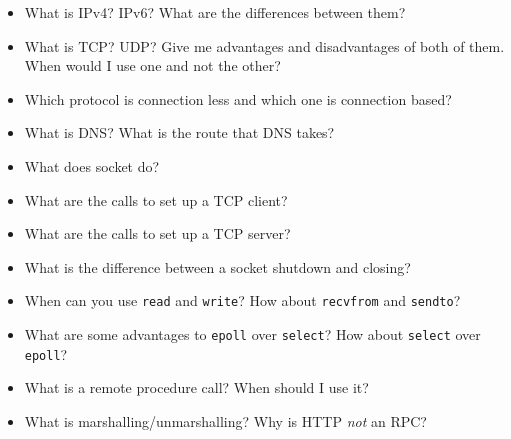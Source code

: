 \begin{itemize}
\tightlist
\item
  What is IPv4? IPv6? What are the differences between them?
\item
  What is TCP? UDP? Give me advantages and disadvantages of both of
  them. When would I use one and not the other?
\item
  Which protocol is connection less and which one is connection based?
\item
  What is DNS? What is the route that DNS takes?
\item
  What does socket do?
\item
  What are the calls to set up a TCP client?
\item
  What are the calls to set up a TCP server?
\item
  What is the difference between a socket shutdown and closing?
\item
  When can you use \texttt{read} and \texttt{write}? How about
  \texttt{recvfrom} and \texttt{sendto}?
\item
  What are some advantages to \texttt{epoll} over \texttt{select}? How
  about \texttt{select} over \texttt{epoll}?
\item
  What is a remote procedure call? When should I use it?
\item
  What is marshalling/unmarshalling? Why is HTTP \emph{not} an RPC?
\end{itemize}
